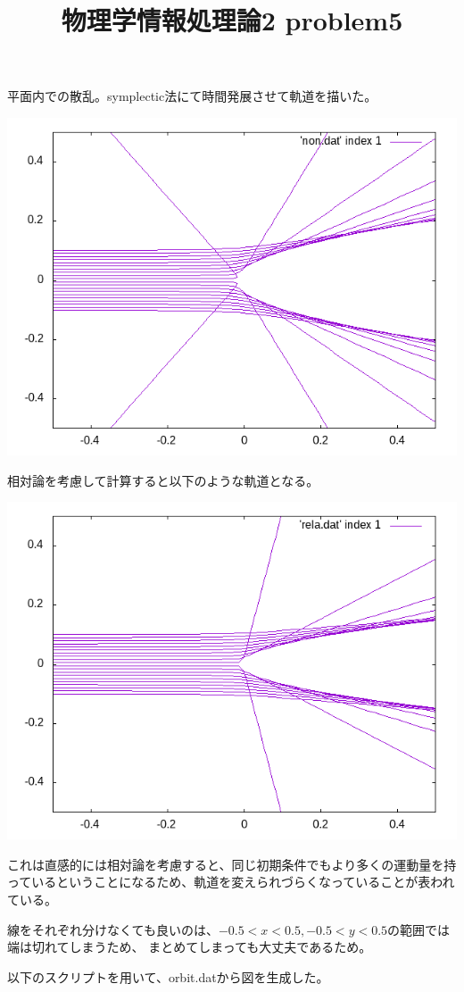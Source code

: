\documentclass[12pt,a5]{bxjsarticle}
\title{物理学情報処理論2 problem5}
\date{}
\begin{document}
\maketitle

\section{}
平面内での散乱。symplectic法にて時間発展させて軌道を描いた。

\includegraphics[width=\linewidth]{orbit.png}

相対論を考慮して計算すると以下のような軌道となる。

\includegraphics[width=\linewidth]{rela-orbit.png}

これは直感的には相対論を考慮すると、同じ初期条件でもより多くの運動量を持っているということになるため、軌道を変えられづらくなっていることが表われている。

線をそれぞれ分けなくても良いのは、$ -0.5 < x < 0.5, -0.5 < y < 0.5 $の範囲では端は切れてしまうため、
まとめてしまっても大丈夫であるため。

以下のスクリプトを用いて、orbit.datから図を生成した。

\end{document}
